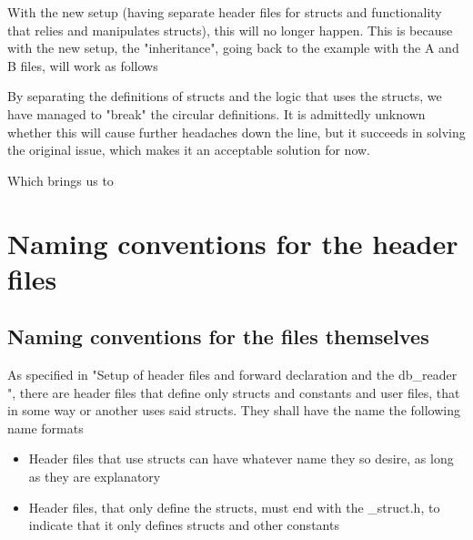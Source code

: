 \documentclass{report}
\begin{document}
With the new setup (having separate header files for structs and functionality that relies and manipulates structs), this will no longer happen. This is because with the new setup, the "inheritance", going back to the example with the A and B files, will work as follows
\begin{center}
\end{center}

By separating the definitions of structs and the logic that uses the structs, we have managed to "break" the circular definitions. It is admittedly unknown whether this will cause further headaches down the line, but it succeeds in solving the original issue, which makes it an acceptable solution for now. 

Which brings us to 
\begin{center}
\end{center}

\section*{Naming conventions for the header files}
\subsection*{Naming conventions for the files themselves}
As specified in "Setup of header files and forward declaration and the db\_reader ", there are header files that define only structs and constants and user files, that in some way or another uses said structs. They shall have the name the following name formats
\begin{itemize}
\item Header files that use structs can have whatever name they so desire, as long as they are explanatory
\item Header files, that only define the structs, must end with the \_struct.h, to indicate that it only defines structs and other constants
\end{itemize}
\end{document}
